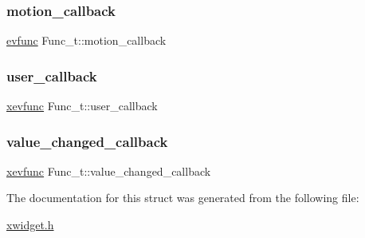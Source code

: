 \mbox{\label{structFunc__t_ac2842c834907f4aeace8f404c6cc7621}} 
\subsubsection{\texorpdfstring{motion\+\_\+callback}{motion\_callback}}
{\footnotesize\ttfamily \hyperlink{xwidget_8h_ab4ae973f86a383c8c0f92b709044520a}{evfunc} Func\+\_\+t\+::motion\+\_\+callback}

\mbox{\label{structFunc__t_a1f089cb13a39764a1f980470a51db71b}} 
\subsubsection{\texorpdfstring{user\+\_\+callback}{user\_callback}}
{\footnotesize\ttfamily \hyperlink{xwidget_8h_a9ef0263424a7f5f8f6b02055fca67ddd}{xevfunc} Func\+\_\+t\+::user\+\_\+callback}

\mbox{\label{structFunc__t_acce396ccf3266886f0a6d28cf45761d3}} 
\subsubsection{\texorpdfstring{value\+\_\+changed\+\_\+callback}{value\_changed\_callback}}
{\footnotesize\ttfamily \hyperlink{xwidget_8h_a9ef0263424a7f5f8f6b02055fca67ddd}{xevfunc} Func\+\_\+t\+::value\+\_\+changed\+\_\+callback}



The documentation for this struct was generated from the following file\+:\begin{DoxyCompactItemize}
\item 
\hyperlink{xwidget_8h}{xwidget.\+h}\end{DoxyCompactItemize}
